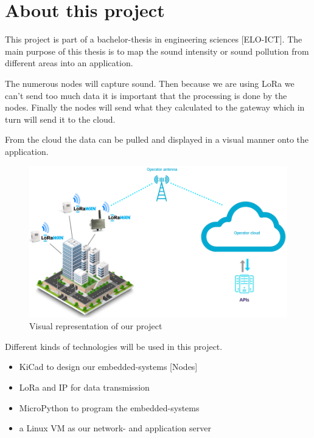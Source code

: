 \chapter{About this project}\label{ch:about}


This project is part of a bachelor-thesis in engineering sciences [ELO-ICT].
The main purpose of this thesis is to map the sound intensity or sound pollution from different areas into an application. 

The numerous nodes will capture sound. Then because we are using LoRa we can't send too much data it is important that the processing is done by the nodes. Finally the nodes will send what they calculated to the gateway which in turn will send it to the cloud. 

From the cloud the data can be pulled and displayed in a visual manner onto the application.

\begin{figure}[hb]\centering
     \includegraphics[width=1\textwidth,height=1\textheight,keepaspectratio]{figs/IOT_Netwerk}
	\caption{Visual representation of our project}\label{fig:radiation}
\end{figure}

Different kinds of technologies will be used in this project.
\begin{itemize}
    \item KiCad to design our embedded-systems [Nodes]
    \item LoRa and IP for data transmission
    \item MicroPython to program the embedded-systems
    \item a Linux VM as our network- and application server
\end{itemize}

 





